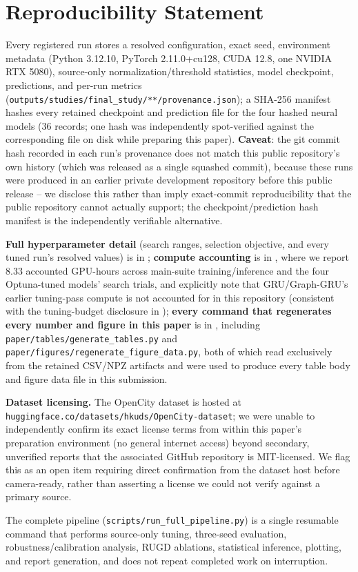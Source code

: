 \section*{Reproducibility Statement}

Every registered run stores a resolved configuration, exact seed, environment metadata (Python
3.12.10, PyTorch 2.11.0+cu128, CUDA 12.8, one NVIDIA RTX 5080), source-only normalization/threshold
statistics, model checkpoint, predictions, and per-run metrics
(\texttt{outputs/studies/final\_study/**/provenance.json}); a SHA-256 manifest hashes every
retained checkpoint and prediction file for the four hashed neural models (36 records; one hash was
independently spot-verified against the corresponding file on disk while preparing this paper).
\textbf{Caveat}: the git commit hash recorded in each run's provenance does not match this public
repository's own history (which was released as a single squashed commit), because these runs were
produced in an earlier private development repository before this public release -- we disclose
this rather than imply exact-commit reproducibility that the public repository cannot actually
support; the checkpoint/prediction hash manifest is the independently verifiable alternative.

\textbf{Full hyperparameter detail} (search ranges, selection objective, and every tuned run's
resolved values) is in ; \textbf{compute accounting} is in
, where we report 8.33 accounted GPU-hours across main-suite training/inference
and the four Optuna-tuned models' search trials, and explicitly note that GRU/Graph-GRU's earlier
tuning-pass compute is not accounted for in this repository (consistent with the tuning-budget
disclosure in ); \textbf{every command that regenerates every number and figure in
this paper} is in , including \texttt{paper/tables/generate\_tables.py} and
\texttt{paper/figures/regenerate\_figure\_data.py}, both of which read exclusively from the
retained CSV/NPZ artifacts and were used to produce every table body and figure data file in this
submission.

\textbf{Dataset licensing.} The OpenCity dataset is hosted at
\texttt{huggingface.co/datasets/hkuds/OpenCity-dataset}; we were unable to independently confirm
its exact license terms from within this paper's preparation environment (no general internet
access) beyond secondary, unverified reports that the associated GitHub repository is MIT-licensed.
We flag this as an open item requiring direct confirmation from the dataset host before
camera-ready, rather than asserting a license we could not verify against a primary source.

The complete pipeline (\texttt{scripts/run\_full\_pipeline.py}) is a single resumable command that
performs source-only tuning, three-seed evaluation, robustness/calibration analysis, RUGD
ablations, statistical inference, plotting, and report generation, and does not repeat completed
work on interruption.
